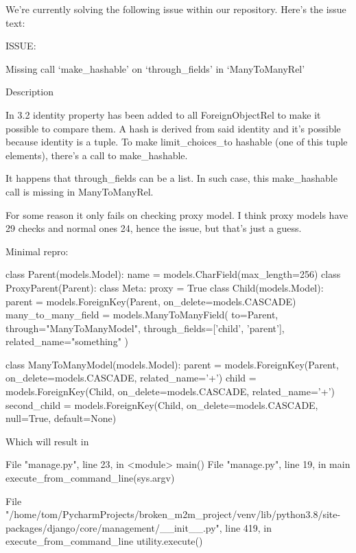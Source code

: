 {
\captionsetup{type=figure}
\begin{issuebox}We're currently solving the following issue within our repository. Here's the issue text:

ISSUE:

Missing call `make\_hashable' on `through\_fields' in `ManyToManyRel'

Description

	

In 3.2 identity property has been added to all ForeignObjectRel to make it possible to compare them. A hash is derived from said identity and it's possible because identity is a tuple. To make limit\_choices\_to hashable (one of this tuple elements), there's a call to make\_hashable.

It happens that through\_fields can be a list. In such case, this make\_hashable call is missing in ManyToManyRel.

For some reason it only fails on checking proxy model. I think proxy models have 29 checks and normal ones 24, hence the issue, but that's just a guess.

Minimal repro:
\begin{CodeVerbatim}[breaklines=true, breakanywhere=true]
class Parent(models.Model):
	name = models.CharField(max\_length=256)
class ProxyParent(Parent):
	class Meta:
		proxy = True
class Child(models.Model):
	parent = models.ForeignKey(Parent, on\_delete=models.CASCADE)
	many\_to\_many\_field = models.ManyToManyField(
		to=Parent,
		through="ManyToManyModel",
		through\_fields=['child', 'parent'],
		related\_name="something"
	)

class ManyToManyModel(models.Model):
	parent = models.ForeignKey(Parent, on\_delete=models.CASCADE, related\_name='+')
	child = models.ForeignKey(Child, on\_delete=models.CASCADE, related\_name='+')
	second\_child = models.ForeignKey(Child, on\_delete=models.CASCADE, null=True, default=None)
\end{CodeVerbatim}

Which will result in 
\begin{CodeVerbatim}[breaklines=true, breakanywhere=true]
 File "manage.py", line 23, in <module>
	main()
 File "manage.py", line 19, in main
	execute\_from\_command\_line(sys.argv)

 File "/home/tom/PycharmProjects/broken\_m2m\_project/venv/lib/python3.8/site-packages/django/core/management/\_\_init\_\_.py", line 419, in execute\_from\_command\_line
	utility.execute()


\end{CodeVerbatim}
\end{issuebox}}
